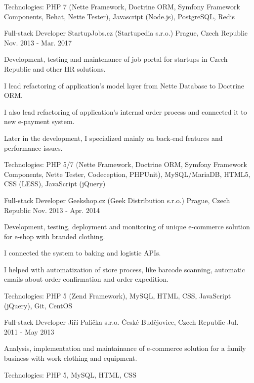 \begin{cventries}
{\begin{cvitems}
        \item {Technologies: PHP 7 (Nette Framework, Doctrine ORM, Symfony Framework Components, Behat, Nette Tester), Javascript (Node.js), PostgreSQL, Redis}
      \end{cvitems}
    }
  \cventry
    {Full-stack Developer}
    {StartupJobs.cz (Startupedia s.r.o.)}
    {Prague, Czech Republic}
    {Nov. 2013 - Mar. 2017}
    {
      \begin{cvitems}
        \item {Development, testing and maintenance of job portal for startups in Czech Republic and other HR solutions.}
        \item {I lead refactoring of application's model layer from Nette Database to Doctrine ORM.}
        \item {I also lead refactoring of application's internal order process and connected it to new e-payment system.}
        \item {Later in the development, I specialized mainly on back-end features and performance issues.}
        \item {Technologies: PHP 5/7 (Nette Framework, Doctrine ORM, Symfony Framework Components, Nette Tester, Codeception, PHPUnit), MySQL/MariaDB, HTML5, CSS (LESS), JavaScript (jQuery)}
      \end{cvitems}
    }
  \cventry
    {Full-stack Developer}
    {Geekshop.cz (Geek Distribution s.r.o.)}
    {Prague, Czech Republic}
    {Nov. 2013 - Apr. 2014}
    {
      \begin{cvitems}
        \item {Development, testing, deployment and monitoring of unique e-commerce solution for e-shop with branded clothing.}
        \item {I connected the system to baking and logistic APIs.}
        \item {I helped with automatization of store process, like barcode scanning, automatic emails about order confirmation and order expedition.}
        \item {Technologies: PHP 5 (Zend Framework), MySQL, HTML, CSS, JavaScript (jQuery), Git, CentOS}
      \end{cvitems}
    }
  \cventry
    {Full-stack Developer}
    {Jiří Palička s.r.o.}
    {České Budějovice, Czech Republic}
    {Jul. 2011 - May 2013}
    {
      \begin{cvitems}
        \item {Analysis, implementation and maintainance of e-commerce solution for a family business with work clothing and equipment.}
        \item {Technologies: PHP 5, MySQL, HTML, CSS}
      \end{cvitems}
    }
\end{cventries}
